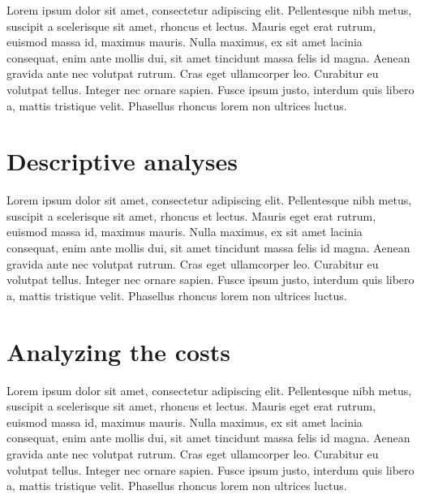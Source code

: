 

\label{chap:results}
Lorem ipsum dolor sit amet, consectetur adipiscing elit. Pellentesque nibh metus, suscipit a scelerisque sit amet, rhoncus et lectus. Mauris eget erat rutrum, euismod massa id, maximus mauris. Nulla maximus, ex sit amet lacinia consequat, enim ante mollis dui, sit amet tincidunt massa felis id magna. Aenean gravida ante nec volutpat rutrum. Cras eget ullamcorper leo. Curabitur eu volutpat tellus. Integer nec ornare sapien. Fusce ipsum justo, interdum quis libero a, mattis tristique velit. Phasellus rhoncus lorem non ultrices luctus.

\section{Descriptive analyses}\label{sec:descriptiveanalyses}
Lorem ipsum dolor sit amet, consectetur adipiscing elit. Pellentesque nibh metus, suscipit a scelerisque sit amet, rhoncus et lectus. Mauris eget erat rutrum, euismod massa id, maximus mauris. Nulla maximus, ex sit amet lacinia consequat, enim ante mollis dui, sit amet tincidunt massa felis id magna. Aenean gravida ante nec volutpat rutrum. Cras eget ullamcorper leo. Curabitur eu volutpat tellus. Integer nec ornare sapien. Fusce ipsum justo, interdum quis libero a, mattis tristique velit. Phasellus rhoncus lorem non ultrices luctus.

\section{Analyzing the costs}\label{sec:analyzingcosts}
Lorem ipsum dolor sit amet, consectetur adipiscing elit. Pellentesque nibh metus, suscipit a scelerisque sit amet, rhoncus et lectus. Mauris eget erat rutrum, euismod massa id, maximus mauris. Nulla maximus, ex sit amet lacinia consequat, enim ante mollis dui, sit amet tincidunt massa felis id magna. Aenean gravida ante nec volutpat rutrum. Cras eget ullamcorper leo. Curabitur eu volutpat tellus. Integer nec ornare sapien. Fusce ipsum justo, interdum quis libero a, mattis tristique velit. Phasellus rhoncus lorem non ultrices luctus.

